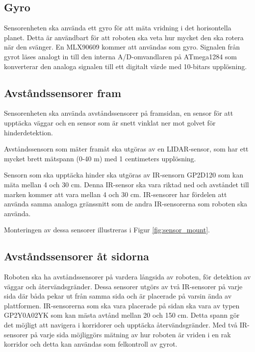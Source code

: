 \documentclass[a4paper,titlepage,12pt]{article}
\begin{document}
	\subsection{Gyro}

	Sensorenheten ska använda ett gyro för att mäta vridning i det horisontella
	planet. Detta är användbart för att roboten ska veta hur mycket
	den ska rotera när den svänger. En MLX90609 kommer att användas som gyro. Signalen från 
	gyrot läses analogt in till den interna A/D-omvandlaren på ATmega1284 som konverterar 
	den analoga signalen till ett digitalt värde med 10-bitars upplösning. 
	
	\subsection{Avståndssensorer fram}
	
	Sensorenheten ska använda avståndssensorer på framsidan, en sensor för att
	upptäcka väggar och en sensor som är snett vinklat ner mot golvet för hinderdetektion. 

	Avståndssensorn som mäter framåt ska utgöras av en LIDAR-sensor, som har
    ett mycket brett mätspann (0-40 m) med 1 centimeters upplösning.

	Sensorn som ska upptäcka hinder ska utgöras av IR-sensorn GP2D120 som kan mäta mellan 
	4 och 30 cm. Denna IR-sensor ska vara riktad ned och avståndet till marken kommer 
	att vara mellan 4 och 30 cm. IR-sensorer har fördelen att använda samma analoga gränssnitt 
	som de andra IR-sensorerna som roboten ska använda. 

    Monteringen av dessa sensorer illustreras i Figur \ref{fig:sensor_mount}.

	\subsection{Avståndssensorer åt sidorna}
	Roboten ska ha avståndssensorer på vardera långsida av roboten, för
	detektion av väggar och återvändsgränder. Dessa sensorer utgörs av två 
    IR-sensorer på varje sida där båda pekar ut från samma sida och
	är placerade på varsin ända av plattformen. IR-sensorerna som ska vara placerade 
	på sidan ska vara av typen GP2Y0A02YK som kan mästa avtånd mellan 20 och 150 cm. 
	Detta spann gör det möjligt att navigera i korridorer och upptäcka 
	återvändsgränder. Med två IR-sensorer på varje sida möjliggörs mätning av hur 
	roboten är vriden i en rak korridor och detta kan användas som felkontroll av gyrot.
\end{document}
